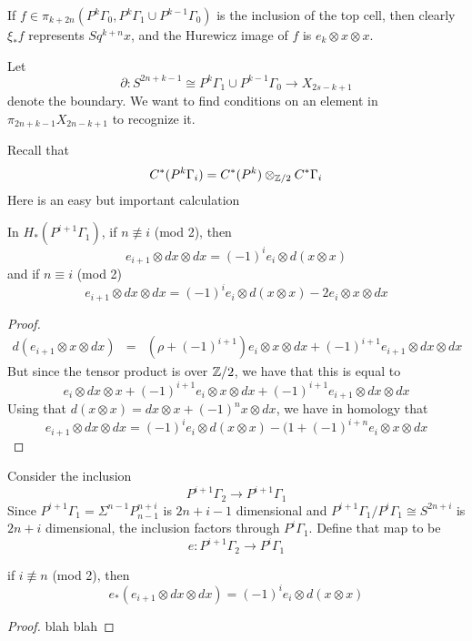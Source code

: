 If $f\in \pi_{k+2n}(P^k\Gamma_0,P^k\Gamma_1\cup P^{k-1}\Gamma_0)$ is the inclusion of the top cell, then clearly $\xi_*f$ represents $Sq^{k+n}x$, and the Hurewicz image of $f$ is $e_k\otimes x\otimes x$.



Let 
\[\partial:S^{2n+k-1}\cong P^k\Gamma_1\cup P^{k-1}\Gamma_0 \to X_{2s-k+1}\]
denote the boundary.  
We want to find conditions on an element in $\pi_{2n+k-1}X_{2n-k+1}$ to recognize it.  

Recall that
\[C^*(P^k\Gamma_i)=C^*(P^k)\otimes_{\mathbb{Z}/2} C^*\Gamma_i\]
Here is an easy but important calculation
\begin{Lemma}
  \label{sec:elemma}
  In $H_*(P^{i+1}\Gamma_1)$, if $n\not\equiv i$ (mod 2), then
  \[e_{i+1}\otimes dx\otimes dx = (-1)^ie_i\otimes d(x\otimes x)\]
  and if $n\equiv i$ (mod 2)
  \[e_{i+1}\otimes dx\otimes dx = (-1)^ie_i\otimes d(x\otimes x)-2e_i\otimes x\otimes dx\]
\end{Lemma}

\begin{proof}
  \begin{eqnarray*}
    d(e_{i+1}\otimes x\otimes dx)  &=& 
    (\rho+(-1)^{i+1})e_i\otimes x\otimes dx + (-1)^{i+1}e_{i+1}\otimes dx\otimes dx
  \end{eqnarray*}
  But since the tensor product is over $\mathbb{Z}/2$, we have that this is equal to
  \[e_i\otimes dx \otimes x + (-1)^{i+1}e_i\otimes x\otimes dx + (-1)^{i+1}e_{i+1}\otimes dx\otimes dx\]
  Using that $d(x\otimes x)=dx\otimes x + (-1)^n x\otimes dx$, we have in homology that
  \[e_{i+1}\otimes dx\otimes dx = (-1)^ie_i\otimes d(x\otimes x) - (1+(-1)^{i+n}e_i\otimes x\otimes dx\]
\end{proof}

Consider the inclusion
\[P^{i+1}\Gamma_2\to P^{i+1}\Gamma_1\]
Since  $P^{i+1}\Gamma_1=\Sigma^{n-1}P^{n+i}_{n-1}$ is $2n+i-1$ dimensional and 
$P^{i+1}\Gamma_1/P^{i}\Gamma_1\cong S^{2n+i}$ is $2n+i$ dimensional, the inclusion factors through $P^i\Gamma_1$.  
Define that map to be 
\[e:P^{i+1}\Gamma_2\to P^i\Gamma_1\]
\begin{Lemma}
  \label{sec:e_hom_lem}
  if $i\not\equiv n$ (mod 2), then
  \[e_*(e_{i+1}\otimes dx\otimes dx) = (-1)^ie_i\otimes d(x\otimes x)\]
\end{Lemma}

\begin{proof}
  blah blah
\end{proof}

